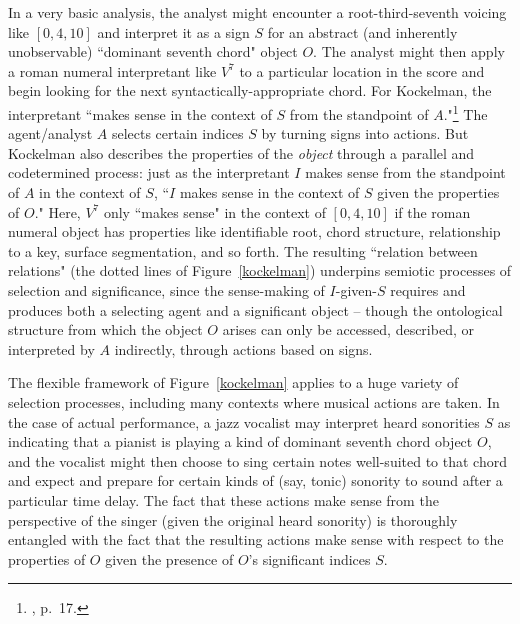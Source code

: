 In a very basic analysis, the analyst might encounter a root-third-seventh voicing like $[0,4,10]$ and interpret it as a sign $S$ for an abstract (and inherently unobservable) ``dominant seventh chord" object $O$.  The analyst might then apply a roman numeral interpretant like $V^7$ to a particular location in the score and begin looking for the next syntactically-appropriate chord.  For Kockelman, the interpretant ``makes sense in the context of $S$ from the standpoint of $A$."\footnote{\cite{kockelman2013}, p.\ 17.}  The agent/analyst $A$ selects certain indices $S$ by turning signs into actions.  But Kockelman also describes the properties of the \emph{object} through a parallel and codetermined process: just as the interpretant $I$ makes sense from the standpoint of $A$ in the context of $S$, ``$I$ makes sense in the context of $S$ given the properties of $O$."  Here, $V^7$ only ``makes sense" in the context of $[0,4,10]$ if the roman numeral object has properties like identifiable root, chord structure, relationship to a key, surface segmentation, and so forth.  The resulting ``relation between relations" (the dotted lines of Figure~\ref{kockelman}) underpins semiotic processes of selection and significance, since the sense-making of $I$-given-$S$ requires and produces both a selecting agent and a significant object -- though the ontological structure from which the object $O$ arises can only be accessed, described, or interpreted by $A$ indirectly, through actions based on signs.

The flexible framework of Figure~\ref{kockelman} applies to a huge variety of selection processes, including many contexts where musical actions are taken.  In the case of actual performance, a jazz vocalist may interpret heard sonorities $S$ as indicating that a pianist is playing a kind of dominant seventh chord object $O$, and the vocalist might then choose to sing certain notes well-suited to that chord and expect and prepare for certain kinds of (say, tonic) sonority to sound after a particular time delay.  The fact that these actions make sense from the perspective of the singer (given the original heard sonority) is thoroughly entangled with the fact that the resulting actions make sense with respect to the properties of $O$ given the presence of $O$'s significant indices $S$.


